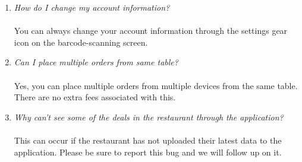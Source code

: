 \documentclass[12pt, titlepage]{article}
\begin{document}
\begin{enumerate}
	\item \emph{How do I change my account information?}\\\\
	You can always change your account information through the settings gear icon on the barcode-scanning screen.
	\item \emph{Can I place multiple orders from same table?}\\\\
	Yes, you can place multiple orders from multiple devices from the same table. There are no extra fees associated with this. 
	\item \emph{Why can't %
	see some of the deals in the restaurant through the application?}\\\\
	This can occur if the restaurant has not uploaded their latest data to the application. Please be sure to report this bug and we will follow up on it.
\end{enumerate}
	

\end{document}

